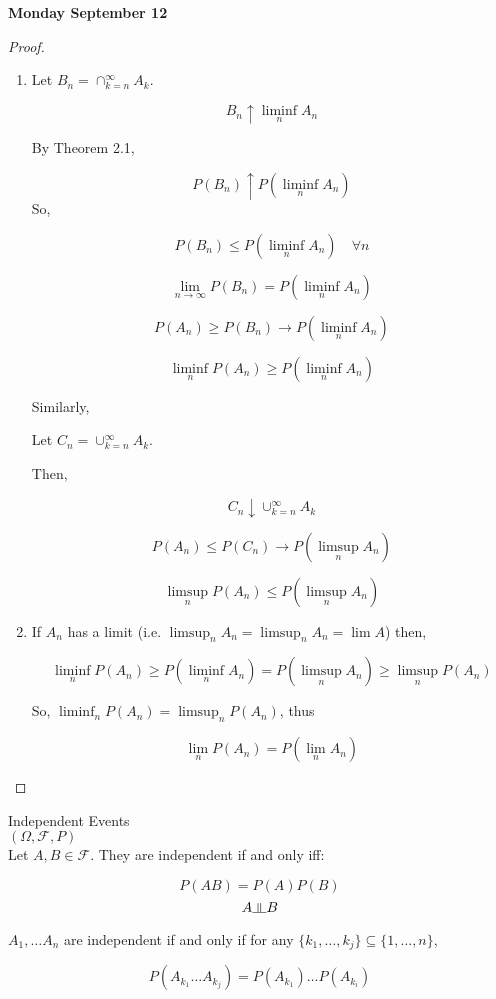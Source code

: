 \documentclass[11pt,fleqn]{book} %
\newcommand{\indep}{\rotatebox[origin=c]{90}{$\models$}}
\begin{document}
\textbf{Monday September 12}

\begin{proof}
	\begin{enumerate}[label = (\roman*)]
		\item Let $B_n = \cap^\infty_{k=n} A_k$. 

			$$B_n \uparrow \liminf_{n } A_n $$

			By Theorem 2.1,  

			$$P(B_n) \uparrow P(\liminf_{n } A_n) $$
			So, 

			$$P(B_n) \leq P(\liminf_{n } A_n) \quad \forall n $$

			$$\lim_{n \rightarrow \infty} P(B_n)  = P(\liminf_{n} A_n)$$

			$$P(A_n) \geq P(B_n) \rightarrow P(\liminf_n A_n) $$

			$$\liminf_n P(A_n) \geq P(\liminf_{n} A_n)$$

			Similarly, 

			Let $C_n = \cup^\infty_{k=n} A_k$. 

			Then, 

			$$ C_n \downarrow \cup^\infty_{k=n} A_k$$

			$$P(A_n) \leq P(C_n) \rightarrow P(\limsup_{n } A_n) $$

			$$ \limsup_{n }P( A_n) \leq  P(\limsup_{n } A_n)$$

			\item If $A_n$ has a limit (i.e. $\limsup_n A_n = \limsup_n A_n = \lim A$) then,

			$$\liminf_n P(A_n) \geq P(\liminf_n A_n) = P(\limsup_n A_n) \geq \limsup_n P(A_n) $$

			So, $\liminf_n P(A_n) = \limsup_n P(A_n)$, thus

			$$\lim_n P(A_n) = P(\lim_n A_n) $$

	\end{enumerate}
\end{proof}


Independent Events\\

$(\Omega, \mathscr{F}, P)$\\

Let $A, B \in \mathscr{F}$. They are independent if and only iff: 

$$P(AB) = P(A)P(B) $$
$$A \indep B  $$

$A_1, \dots A_n$ are independent if and only if for any $\{k_1, \dots, k_j \} \subseteq \{1, \dots, n\}$, 

$$P(A_{k_1} \dots A_{k_j}) = P(A_{k_1}) \dots P(A_{k_i}) $$
\end{document}
